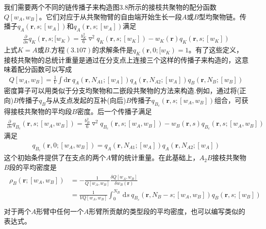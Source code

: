 我们需要两个不同的链传播子来构造图$3.8$所示的接枝共聚物的配分函数$Q[w_A,w_B]$。它们对应于从共聚物臂的自由端开始生长一段$A$或$B$型均聚物链。传播子$q_A(\mathbf{r},s;[w_A])$和$q_A(\mathbf{r},s;[w_A])$满足
\begin{gather}
\frac{\partial}{\partial s}q_K(\mathbf{r},s;[w_K)=\frac{b_K^2}{6}\triangledown ^2q_K(\mathbf{r},s;[w_K])-w_K(\mathbf{r})q_K(\mathbf{r},s;[w_K])
\end{gather}
上式$K=A$或$B$.方程$(3.107)$的求解条件是$q_K(\mathbf{r},0;[w_K)=1$。有了这些定义，接枝共聚物的总统计重量是通过在分支点上连接三个这样的传播子来构造的，这意味着配分函数可以写成
\begin{gather}
Q[w_A,w_B]=\frac{1}{V}\int \mathrm{d}\mathbf{r}~q_A(\mathbf{r},N_{A1};[w_A])q_A(\mathbf{r},N_{A2};[w_A])q_B(\mathbf{r},N_B;[w_B])
\end{gather}
密度算子可以用类似于分支均聚物和二嵌段共聚物的方法来构造.例如，通过将(正向)$B$传播子$q_B$与从支点发起的互补(向后)$B$传播子$q_{B_c}(\mathbf{r},s;[w_A,w_B])$组合，可获得接枝共聚物的平均段$B$密度。后一个传播子满足
\begin{gather}
\frac{\partial}{\partial s}q_{B_c}(\mathbf{r},s;[w_A,w_B])=\frac{b_B^2}{6}\triangledown ^2q_{B_c}(\mathbf{r},s;[w_A,w_B])-w_B(\mathbf{r},s)q_{B_c}(\mathbf{r},s;[w_A,w_B])
\end{gather}
满足
\begin{gather}
q_{B_c}(\mathbf{r},0;[w_A,w_B])=q_A(\mathbf{r},N_{A1};[w_A])q_A(\mathbf{r},N_{A2};[w_A])
\end{gather}
这个初始条件提供了在支点的两个$A$臂的统计重量。在此基础上，$A_2B$接枝共聚物$B$段的平均密度是
\begin{gather}
\begin{align}
\rho _B(\mathbf{r};[w_A,w_B]) & =-\frac{1}{Q[w_A,w_B]}	\frac{\delta Q[w_A,w_B]}{\delta w_B(\mathbf{r})} \\
&= \frac{1}{VQ[w_A,w_B]} \int _{0}^{N_B}\,\mathrm{d}s~q_{B_c}(\mathbf{r},N_B-s;[w_A,w_B])q_B(\mathbf{r},s;[w_B]) \\
\end{align}	
\end{gather}
对于两个$A$形臂中任何一个$A$形臂所贡献的类型段的平均密度，也可以编写类似的表达式。


